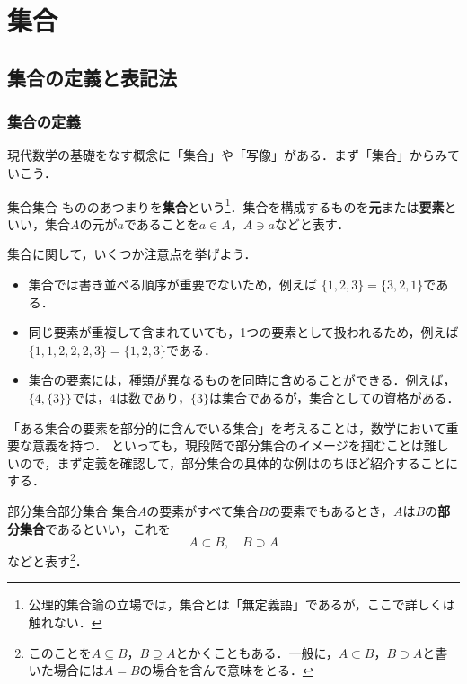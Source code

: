 \documentclass[a4paper,11pt]{ltjsarticle}
\renewcommand{\emph}[1]{\textbf{#1}}
\begin{document}
      \section{集合}
        \subsection{集合の定義と表記法}
      
        \subsubsection{集合の定義}
      
        現代数学の基礎をなす概念に「集合」や「写像」がある．まず「集合」からみていこう．
        \begin{definition}{集合}{集合}
            もののあつまりを\emph{集合}という\footnote{公理的集合論の立場では，集合とは「無定義語」であるが，ここで詳しくは触れない．}．集合を構成するものを\emph{元}または\emph{要素}といい，集合$A$の元が$a$であることを$a \in A$，$A \ni a$などと表す．
        \end{definition}
        
        集合に関して，いくつか注意点を挙げよう．
        
        \begin{itemize}
            \item 集合では書き並べる順序が重要でないため，例えば $\{1, 2, 3\} = \{3, 2, 1\}$である．
            \item 同じ要素が重複して含まれていても，1つの要素として扱われるため，例えば$\{1, 1, 2, 2, 2, 3\} = \{1, 2, 3\}$である．
            \item 集合の要素には，種類が異なるものを同時に含めることができる．例えば，$\{4, \{3\}\}$では，$4$は数であり，$\{3\}$は集合であるが，集合としての資格がある．
        \end{itemize}
      
        「ある集合の要素を部分的に含んでいる集合」を考えることは，数学において重要な意義を持つ．
        といっても，現段階で部分集合のイメージを掴むことは難しいので，まず定義を確認して，部分集合の具体的な例はのちほど紹介することにする．
        
        \begin{definition}{部分集合}{部分集合}
          集合$A$の要素がすべて集合$B$の要素でもあるとき，$A$は$B$の\emph{部分集合}であるといい，これを
          \[
          A \subset B,\quad B \supset A
          \]
          などと表す\footnote{このことを$ A \subseteq B$，$B \supseteq A$とかくこともある．一般に，$A \subset B$，$ B \supset A$と書いた場合には$A=B$の場合を含んで意味をとる．}．
        \end{definition}
      
\end{document}
